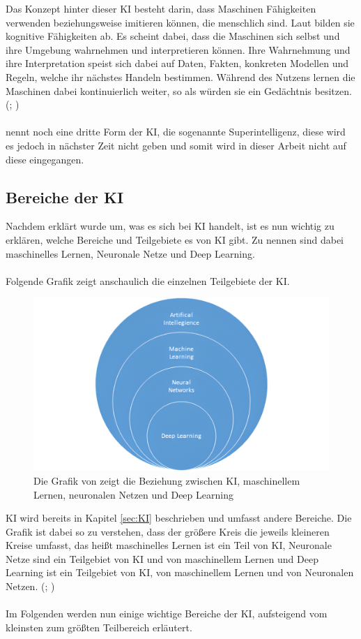 \documentclass[12pt,toc=bib,toc=listof]{scrreprt}
\begin{document}
\noindent Das Konzept hinter dieser KI besteht darin, dass Maschinen Fähigkeiten verwenden beziehungsweise imitieren können, die menschlich sind. Laut \textcite{Hecker2018} bilden sie kognitive Fähigkeiten ab. Es scheint dabei, dass die Maschinen sich selbst und ihre Umgebung wahrnehmen und interpretieren können. Ihre Wahrnehmung und ihre Interpretation speist sich dabei auf Daten, Fakten, konkreten Modellen und Regeln, welche ihr nächstes Handeln bestimmen. Während des Nutzens lernen die Maschinen dabei kontinuierlich weiter, so als würden sie ein Gedächtnis besitzen. (\cite{Bhatt2021}; \cite{Zhu2021})\\
\\
\textcite{Hecker2018} nennt noch eine dritte Form der KI, die sogenannte Superintelligenz, diese wird es jedoch in nächster Zeit nicht geben und somit wird in dieser Arbeit nicht auf diese eingegangen. 
\newpage

\subsection{Bereiche der KI} %
\label{sec:bereicheDerKI}
Nachdem erklärt wurde um, was es sich bei KI handelt, ist es nun wichtig zu erklären, welche Bereiche und Teilgebiete es von KI gibt. Zu nennen sind dabei maschinelles Lernen, Neuronale Netze und Deep Learning.\\
\\
Folgende Grafik zeigt anschaulich die einzelnen Teilgebiete der KI.
\begin{figure} [H]
    \centering
    \includegraphics[width=0.75\linewidth]{./Bilder/Mocko_Die Beziehung zwischen KI, maschinellem Lernen, neuronalen Netzen und Deep Learning.png}
    \caption{Die Grafik von \textcite{Mocko2021} zeigt die Beziehung zwischen KI, maschinellem Lernen, neuronalen Netzen und Deep Learning}
    \label{fig:enter-label}
\end{figure}
\noindent KI wird bereits in Kapitel \ref{sec:KI}  beschrieben und umfasst andere Bereiche. Die Grafik ist dabei so zu verstehen, dass der größere Kreis die jeweils kleineren Kreise umfasst, das heißt maschinelles Lernen ist ein Teil von KI, Neuronale Netze sind ein Teilgebiet von KI und von maschinellem Lernen und Deep Learning ist ein Teilgebiet von KI, von maschinellem Lernen und von Neuronalen Netzen. (\cite{Bhatt2021}; \cite{Zhu2021})\\
\\
Im Folgenden werden nun einige wichtige Bereiche der KI, aufsteigend vom kleinsten zum größten Teilbereich erläutert.\\
\newpage
\end{document}
